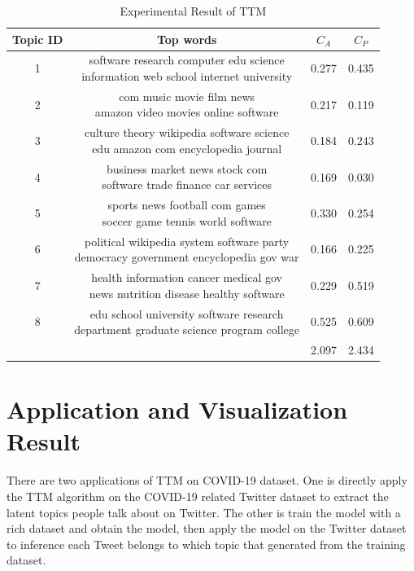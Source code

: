 \begin{table}[htbp]
\centering
\begin{tabular}{|c|c|c|c|}
\hline
Topic ID & Top words & $C_A$ & $C_P$\\
\hline
1 & \tabincell{l}{software research computer edu science \\information web school internet university} & 0.277 & 0.435\\
\hline
2 & \tabincell{l}{com music movie film news \\amazon video movies online software} & 0.217 & 0.119\\
\hline
3 &\tabincell{l}{culture theory wikipedia software science \\edu amazon com encyclopedia journal} & 0.184 & 0.243\\
\hline
4 & \tabincell{l}{business market news stock com \\software trade finance car services} & 0.169 & 0.030\\
\hline
5 & \tabincell{l}{sports news football com games \\soccer game tennis world software} & 0.330 & 0.254\\
\hline
6 & \tabincell{l}{political wikipedia system software party \\democracy government encyclopedia gov war} & 0.166 & 0.225\\
\hline
7 & \tabincell{l}{health information cancer medical gov \\news nutrition disease healthy software} & 0.229 & 0.519\\
\hline
8 & \tabincell{l}{edu school university software research \\department graduate science program college} & 0.525 & 0.609\\
\hline
 & & 2.097 & 2.434\\
\hline
\end{tabular}
\caption{Experimental Result of TTM}
\label{table_4}
\end{table}


\section{Application and Visualization Result}\label{application}
There are two applications of TTM on COVID-19 dataset. One is directly apply the TTM algorithm on the COVID-19 related Twitter dataset to extract the latent topics people talk about on Twitter. The other is train the model with a rich dataset and obtain the model, then  apply the model on the Twitter dataset to inference each Tweet belongs to which topic that generated from the training dataset.


